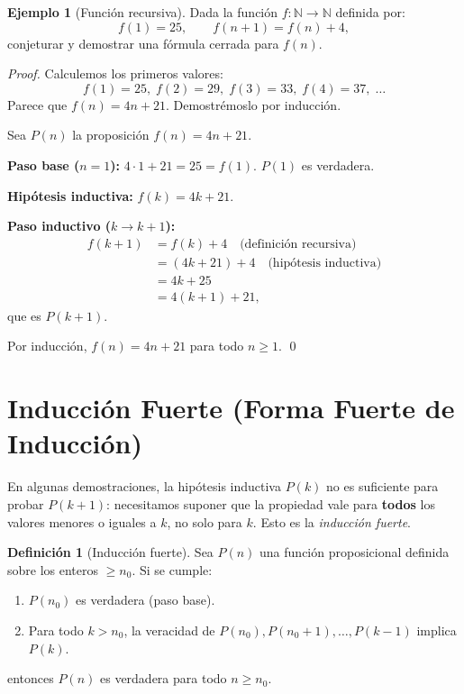 \documentclass[11pt,a4paper]{article}
\theoremstyle{definition}
\newtheorem{definicion}{Definici\'on}[section]
\theoremstyle{plain}
\theoremstyle{definition}
\newtheorem{ejemplo}{Ejemplo}[section]
\theoremstyle{definition}
\theoremstyle{remark}
\newcommand{\N}{\mathbb{N}}               %
\begin{document}
\begin{ejemplo}[Funci\'on recursiva]
\label{ej:recursiva}
Dada la funci\'on $f: \N \to \N$ definida por:
\[
f(1) = 25, \qquad
f(n+1) = f(n) + 4,
\]
conjeturar y demostrar una f\'ormula cerrada para $f(n)$.

\begin{proof}
Calculemos los primeros valores:
\[
f(1)=25,\; f(2)=29,\; f(3)=33,\; f(4)=37,\; \dots
\]
Parece que $f(n) = 4n + 21$. Demostr\'emoslo por inducci\'on.

Sea $P(n)$ la proposici\'on $f(n) = 4n + 21$.

\noindent\textbf{Paso base ($n=1$):}
$4\cdot 1 + 21 = 25 = f(1)$. $P(1)$ es verdadera.

\noindent\textbf{Hip\'otesis inductiva:} $f(k) = 4k + 21$.

\noindent\textbf{Paso inductivo ($k \to k+1$):}
\[
\begin{aligned}
f(k+1) &= f(k) + 4 \quad\text{(definici\'on recursiva)} \\
       &= (4k + 21) + 4 \quad\text{(hip\'otesis inductiva)} \\
       &= 4k + 25 \\
       &= 4(k+1) + 21,
\end{aligned}
\]
que es $P(k+1)$.

\noindent Por inducci\'on, $f(n) = 4n + 21$ para todo $n \geq 1$.
\qed
\end{proof}
\end{ejemplo}

\section{Inducci\'on Fuerte (Forma Fuerte de Inducci\'on)}

En algunas demostraciones, la hip\'otesis inductiva $P(k)$ no es suficiente para
probar $P(k+1)$: necesitamos suponer que la propiedad vale para \textbf{todos}
los valores menores o iguales a $k$, no solo para $k$. Esto es la
\emph{inducci\'on fuerte}.

\begin{definicion}[Inducci\'on fuerte]
\label{def:induccionfuerte}
Sea $P(n)$ una funci\'on proposicional definida sobre los enteros $\geq n_0$.
Si se cumple:
\begin{enumerate}
    \item $P(n_0)$ es verdadera (paso base).
    \item Para todo $k > n_0$, la veracidad de
          $P(n_0), P(n_0+1), \dots, P(k-1)$ implica $P(k)$.
\end{enumerate}
entonces $P(n)$ es verdadera para todo $n \geq n_0$.
\end{definicion}
\end{document}
